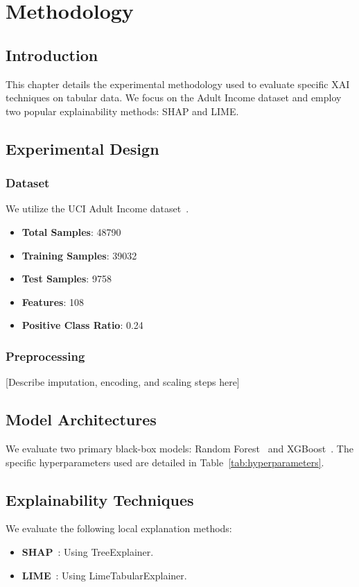 \chapter{Methodology}
\label{ch:methodology}

\section{Introduction}
This chapter details the experimental methodology used to evaluate specific XAI techniques on tabular data. We focus on the Adult Income dataset and employ two popular explainability methods: SHAP and LIME.

\section{Experimental Design}

\subsection{Dataset}
We utilize the UCI Adult Income dataset~\cite{kohavi1996adult}.
\begin{itemize}
    \item \textbf{Total Samples}: 48790
    \item \textbf{Training Samples}: 39032
    \item \textbf{Test Samples}: 9758
    \item \textbf{Features}: 108
    \item \textbf{Positive Class Ratio}: 0.24
\end{itemize}

\subsection{Preprocessing}
[Describe imputation, encoding, and scaling steps here]

\section{Model Architectures}
We evaluate two primary black-box models: Random Forest~\cite{breiman2001random} and XGBoost~\cite{chen2016xgboost}. The specific hyperparameters used are detailed in Table~\ref{tab:hyperparameters}.



\section{Explainability Techniques}
We evaluate the following local explanation methods:
\begin{itemize}
    \item \textbf{SHAP}~\cite{lundberg2017shap}: Using TreeExplainer.
    \item \textbf{LIME}~\cite{ribeiro2016lime}: Using LimeTabularExplainer.
\end{itemize}

